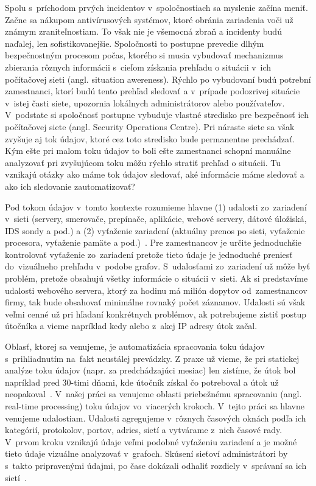 \documentclass[thesismargins, thesislinespacing, openright, upjsfrontpage]{rnthesis}
\begin{document}
Spolu s~príchodom prvých incidentov v~spoločnostiach sa myslenie začína meniť. Začne sa nákupom antivírusových systémov, ktoré obránia zariadenia voči už známym zraniteľnostiam. To však nie je všemocná zbraň a incidenty budú naďalej, len sofistikovanejšie. Spoločnosti to postupne prevedie dlhým bezpečnostným procesom počas, ktorého si musia vybudovať mechanizmus zbierania rôznych informácii s~cieľom získania prehľadu o situácii v~ich počítačovej sieti (angl. situation awereness). Rýchlo po vybudovaní budú potrební zamestnanci, ktorí budú tento prehľad sledovať a v~prípade podozrivej situácie v~istej časti siete, upozornia lokálnych administrátorov alebo používateľov. V~podstate si spoločnosť postupne vybuduje vlastné stredisko pre bezpečnosť ich počítačovej siete (angl. Security Operations Centre). Pri náraste siete sa však zvyšuje aj tok údajov, ktoré cez toto stredisko bude permanentne prechádzať. Kým ešte pri malom toku údajov to boli ešte zamestnanci schopní manuálne analyzovať pri zvyšujúcom toku môžu rýchlo stratiť prehľad o situácii. Tu vznikajú otázky ako máme tok údajov sledovať, aké informácie máme sledovať a ako ich sledovanie zautomatizovať?

Pod tokom údajov v~tomto kontexte rozumieme hlavne (1) udalosti zo~zariadení v~sieti (servery, smerovače, prepínače, aplikácie, webové servery, dátové úložiská, IDS sondy a pod.) a (2) vyťaženie zariadení (aktuálny prenos po sieti, vyťaženie procesora, vyťaženie pamäte a pod.)~\cite{kent2016cyber}. Pre zamestnancov je určite jednoduchšie kontrolovať vyťaženie zo~zariadení pretože tieto údaje je jednoduché preniesť do~vizuálneho prehľadu v~podobe grafov. S~udalosťami zo~zariadení už môže byť problém, pretože obsahujú všetky informácie o situácii v~sieti. Ak si predstavíme udalosti webového servera, ktorý za hodinu má milión dopytov od~zamestnancov firmy, tak bude obsahovať minimálne rovnaký počet záznamov. Udalosti sú však veľmi cenné už pri hľadaní konkrétnych problémov, ak potrebujeme zistiť postup útočníka a vieme napríklad kedy alebo z~akej IP adresy útok začal. 

Oblasť, ktorej sa venujeme, je automatizácia spracovania toku údajov s~prihliadnutím na~fakt neustálej prevádzky. Z praxe už vieme, že pri statickej analýze toku údajov (napr. za predchádzajúci mesiac) len zistíme, že útok bol napríklad pred 30-timi dňami, kde útočník získal čo potreboval a útok už neopakoval~\cite{park2010study}. V~našej práci sa venujeme oblasti priebežnému spracovaniu (angl. real-time processing) toku údajov vo~viacerých krokoch. V~tejto práci sa hlavne venujeme udalostiam. Udalosti agregujeme v~rôznych časových oknách podľa ich kategórií, protokolov, portov, adries, sietí a vytvárame z~nich časové rady. V~prvom kroku vznikajú údaje veľmi podobné vyťaženiu zariadení a je možné tieto údaje vizuálne analyzovať v~grafoch. Skúsení sieťoví administrátori by s~takto pripravenými údajmi, po čase dokázali odhaliť rozdiely v~správaní sa ich sietí~\cite{papagiannaki2005long}.
\end{document}
